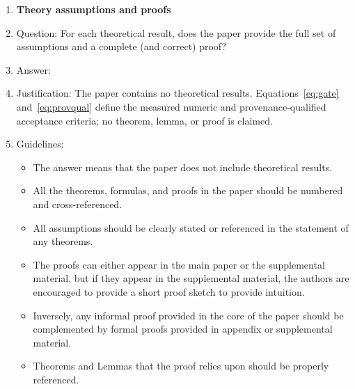 \begin{enumerate}
\begin{itemize}
        \item The authors should discuss the computational efficiency of the proposed algorithms and how they scale with dataset size.
        \item If applicable, the authors should discuss possible limitations of their approach to address problems of privacy and fairness.
        \item While the authors might fear that complete honesty about limitations might be used by reviewers as grounds for rejection, a worse outcome might be that reviewers discover limitations that aren't acknowledged in the paper. The authors should use their best judgment and recognize that individual actions in favor of transparency play an important role in developing norms that preserve the integrity of the community. Reviewers will be specifically instructed to not penalize honesty concerning limitations.
    \end{itemize}

\item {\bf Theory assumptions and proofs}
    \item[] Question: For each theoretical result, does the paper provide the full set of assumptions and a complete (and correct) proof?
    \item[] Answer: \answerNA{}
    \item[] Justification: The paper contains no theoretical results. Equations~\ref{eq:gate} and~\ref{eq:provqual} define the measured numeric and provenance-qualified acceptance criteria; no theorem, lemma, or proof is claimed.
    \item[] Guidelines:
    \begin{itemize}
        \item The answer \answerNA{} means that the paper does not include theoretical results. 
        \item All the theorems, formulas, and proofs in the paper should be numbered and cross-referenced.
        \item All assumptions should be clearly stated or referenced in the statement of any theorems.
        \item The proofs can either appear in the main paper or the supplemental material, but if they appear in the supplemental material, the authors are encouraged to provide a short proof sketch to provide intuition. 
        \item Inversely, any informal proof provided in the core of the paper should be complemented by formal proofs provided in appendix or supplemental material.
        \item Theorems and Lemmas that the proof relies upon should be properly referenced. 
    \end{itemize}


\end{enumerate}
